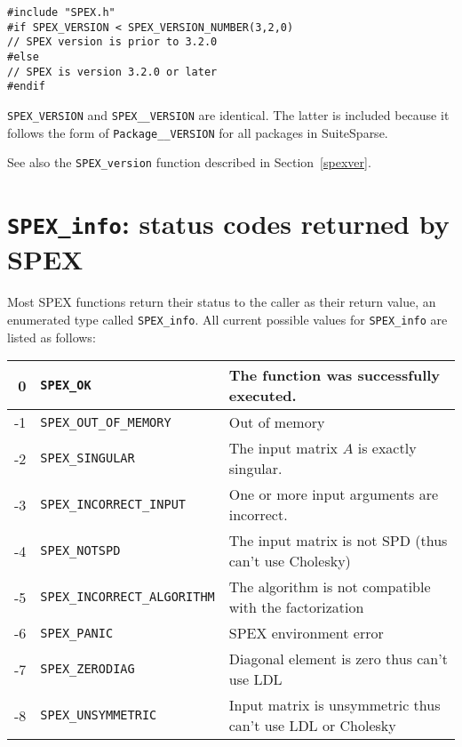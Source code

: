 \documentclass[12pt,oneside]{book}
\theoremstyle{definition}
\newenvironment{SizedCenteredTabular}[2][\small]
    {   
        #1\begin{center}\begin{tabular}{#2}
    }{ 
        \end{tabular}\end{center}
    }
\begin{document}
\begin{verbatim}
#include "SPEX.h"
#if SPEX_VERSION < SPEX_VERSION_NUMBER(3,2,0)
// SPEX version is prior to 3.2.0
#else
// SPEX is version 3.2.0 or later
#endif
\end{verbatim}

\verb'SPEX_VERSION' and \verb'SPEX__VERSION' are identical.  The latter is included
because it follows the form of \verb'Package__VERSION' for all packages in SuiteSparse.

See also the \verb'SPEX_version' function described in Section~\ref{spexver}.

\section{\texttt{SPEX\_info}: status codes returned by SPEX} \label{ss:SPEX_info}
Most SPEX functions return their status to the caller as their return value,
an enumerated type called \verb|SPEX_info|. All current possible values for
\verb|SPEX_info| are listed as follows:

\begin{SizedCenteredTabular}{rll} \hline
     0 & \verb|SPEX_OK|& The function was successfully executed.\\ \hline
    -1 & \verb|SPEX_OUT_OF_MEMORY|& Out of memory\\ \hline
    -2 & \verb|SPEX_SINGULAR|& The input matrix $A$ is exactly singular.\\ \hline
    -3 & \verb|SPEX_INCORRECT_INPUT|& One or more input arguments are incorrect.\\ \hline
    -4 & \verb|SPEX_NOTSPD| & The input matrix is not SPD (thus can't use Cholesky) \\ \hline
    -5 & \verb|SPEX_INCORRECT_ALGORITHM| & The algorithm is not compatible with the factorization \\ \hline
    -6 & \verb|SPEX_PANIC| & SPEX environment error \\ \hline
    -7 & \verb|SPEX_ZERODIAG| & Diagonal element is zero thus can't use LDL \\ \hline
    -8 & \verb|SPEX_UNSYMMETRIC| & Input matrix is unsymmetric thus can't use LDL or Cholesky \\ \hline
\end{SizedCenteredTabular}
\end{document}
